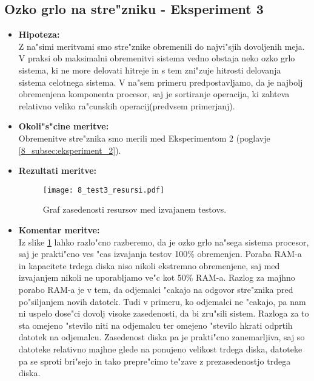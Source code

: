 \newpage
\subsection{Ozko grlo na stre"zniku - Eksperiment 3}
\begin{itemize}
	\item \textbf{Hipoteza: }  \\
		Z na"simi meritvami smo stre"znike obremenili do najvi"sjih dovoljenih meja. V praksi ob maksimalni obremenitvi sistema vedno obstaja neko ozko grlo sistema, ki ne more delovati hitreje in s tem zni"zuje hitrosti delovanja sistema celotnega sistema. V na"sem primeru predpostavljamo, da je najbolj obremenjena komponenta procesor, saj je sortiranje operacija, ki zahteva relativno veliko ra"cunskih operacij(predvsem primerjanj).

	\item \textbf{Okoli"s"cine meritve: } \\
		Obremenitve stre"znika smo merili med Eksperimentom 2 (poglavje \ref{8_subsec:eksperiment_2}).

 	\item \textbf{Rezultati meritve: }  \\
		\begin{figure}[!htb]
  		\centering
  		  \texttt{[image: 8\_test3\_resursi.pdf]}
  		\caption{Graf zasedenosti resursov med izvajanem testovs.}
  		\label{8_graf_zasedenost_resursov}
		\end{figure}


	\item \textbf{Komentar meritve: } \\
		Iz slike \ref{8_graf_zasedenost_resursov} lahko razlo"cno razberemo, da je ozko grlo na"sega sistema procesor, saj je prakti"cno ves "cas izvajanja testov 100\% obremenjen. Poraba RAM-a in kapacitete trdega diska niso nikoli ekstremno obremenjene, saj med izvajanjem nikoli ne uporabljamo ve"c kot 50\% RAM-a. Razlog za majhno porabo RAM-a je v tem, da odjemalci "cakajo na odgovor stre"znika pred po"siljanjem novih datotek. Tudi v primeru, ko odjemalci ne "cakajo, pa nam ni uspelo dose"ci dovolj visoke zasedenosti, da bi zru"sili sistem. Razloga za to sta omejeno "stevilo niti na odjemalcu ter omejeno "stevilo hkrati odprtih datotek na odjemalcu. Zasedenost diska pa je prakti"cno zanemarljiva, saj so datoteke relativno majhne glede na ponujeno velikost trdega diska, datoteke pa se sproti bri"sejo in tako prepre"cimo te"zave z prezasedenostjo trdega diska.
\end{itemize}


